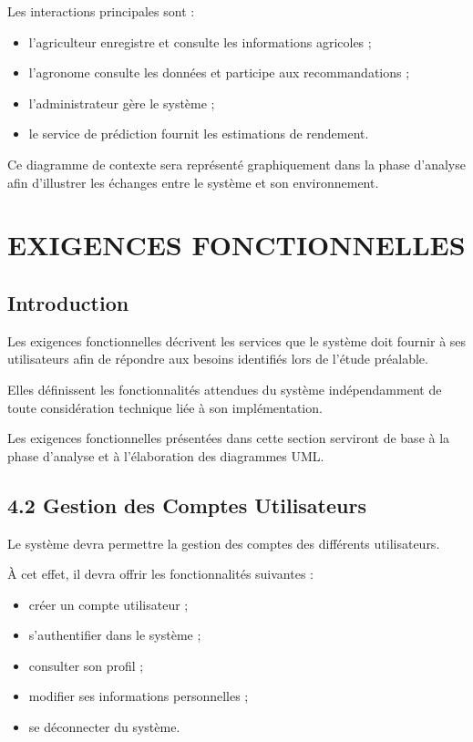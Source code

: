 \documentclass[12pt,a4paper]{report}
\begin{document}
Les interactions principales sont :

\begin{itemize}
\item
  l'agriculteur enregistre et consulte les informations agricoles ;
\item
  l'agronome consulte les données et participe aux recommandations ;
\item
  l'administrateur gère le système ;
\item
  le service de prédiction fournit les estimations de rendement.
\end{itemize}

Ce diagramme de contexte sera représenté graphiquement dans la phase
d'analyse afin d'illustrer les échanges entre le système et son
environnement.

\chapter{EXIGENCES
FONCTIONNELLES}\label{chapitre-4-exigences-fonctionnelles}

\section{Introduction}\label{introduction}

Les exigences fonctionnelles décrivent les services que le système doit
fournir à ses utilisateurs afin de répondre aux besoins identifiés lors
de l'étude préalable.

Elles définissent les fonctionnalités attendues du système
indépendamment de toute considération technique liée à son
implémentation.

Les exigences fonctionnelles présentées dans cette section serviront de
base à la phase d'analyse et à l'élaboration des diagrammes UML.

\section{4.2 Gestion des Comptes
Utilisateurs}\label{gestion-des-comptes-utilisateurs}

Le système devra permettre la gestion des comptes des différents
utilisateurs.

À cet effet, il devra offrir les fonctionnalités suivantes :

\begin{itemize}
\item
  créer un compte utilisateur ;
\item
  s'authentifier dans le système ;
\item
  consulter son profil ;
\item
  modifier ses informations personnelles ;
\item
  se déconnecter du système.
\end{itemize}
\end{document}
